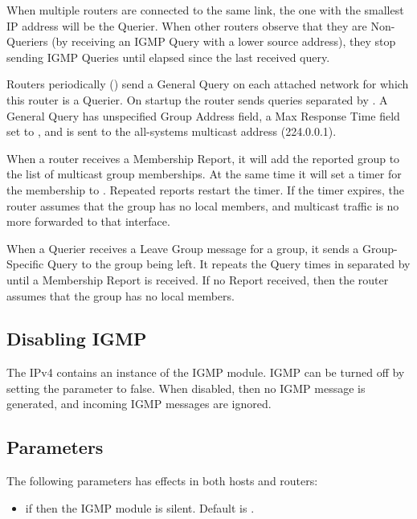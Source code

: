 When multiple routers are connected to the same link, the one with
the smallest IP address will be the Querier. When other routers
observe that they are Non-Queriers (by receiving an IGMP Query
with a lower source address), they stop sending IGMP Queries
until  elapsed since the last
received query.

Routers periodically () send a General Query
on each attached network for which this router is a Querier.
On startup the router sends  queries
separated by . A General Query
has unspecified Group Address field, a Max Response Time
field set to , and is sent to the
all-systems multicast address (224.0.0.1).

When a router receives a Membership Report, it will add the
reported group to the list of multicast group memberships.
At the same time it will set a timer for the membership
to . Repeated reports restart
the timer. If the timer expires, the router assumes
that the group has no local members, and multicast traffic
is no more forwarded to that interface.

When a Querier receives a Leave Group message for a group,
it sends a Group-Specific Query to the group being left.
It repeats the Query  times in
separated by  until a Membership
Report is received. If no Report received, then the router
assumes that the group has no local members.


\subsection{Disabling IGMP}

The IPv4  contains an instance of the IGMP
module. IGMP can be turned off by setting the 
parameter to false. When disabled, then no IGMP message
is generated, and incoming IGMP messages are ignored.

\subsection{Parameters}

The following parameters has effects in both hosts and routers:

\begin{itemize}
  \item {} if  then the IGMP module is silent. Default is .
\end{itemize}

